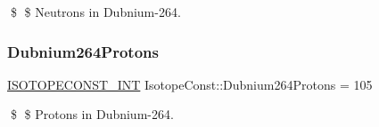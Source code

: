 \$ \$ Neutrons in Dubnium-\/264. \mbox{\label{group___isotope_const-_dubnium-_db264_ga74faf58f67fb1413dffa417128abd25d}} 
\subsubsection{\texorpdfstring{Dubnium264\+Protons}{Dubnium264Protons}}
{\footnotesize\ttfamily \mbox{\hyperlink{group___isotope_const-_macros_ga5f18360b3e99483a35c32d789e62621c}{I\+S\+O\+T\+O\+P\+E\+C\+O\+N\+S\+T\+\_\+\+I\+NT}} Isotope\+Const\+::\+Dubnium264\+Protons = 105}

\$ \$ Protons in Dubnium-\/264. 
